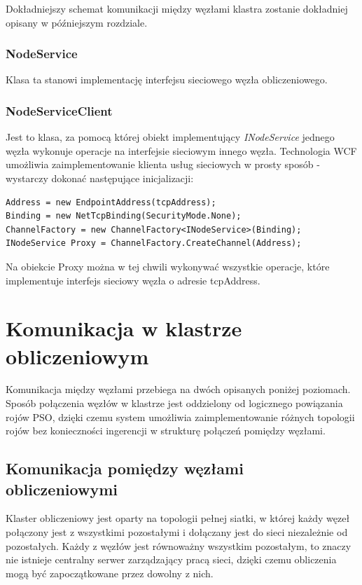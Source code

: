 \documentclass[12pt, twoside, openany, abstract=on]{report}
\theoremstyle{definition}
\begin{document}
Dokładniejszy schemat komunikacji między węzłami klastra zostanie dokładniej opisany w późniejszym rozdziale.

\subsubsection{NodeService}
Klasa ta stanowi implementację interfejsu sieciowego węzła obliczeniowego.

\subsubsection{NodeServiceClient}
Jest to klasa, za pomocą której obiekt implementujący \textit{INodeService} jednego węzła wykonuje operacje na interfejsie sieciowym innego węzła. Technologia WCF umożliwia zaimplementowanie klienta usług sieciowych w prosty sposób - wystarczy dokonać następujące inicjalizacji:


\lstset{style=sharpc}
\begin{lstlisting}[frame=single]
Address = new EndpointAddress(tcpAddress);
Binding = new NetTcpBinding(SecurityMode.None);
ChannelFactory = new ChannelFactory<INodeService>(Binding);
INodeService Proxy = ChannelFactory.CreateChannel(Address);
\end{lstlisting}             

Na obiekcie Proxy można w tej chwili wykonywać wszystkie operacje, które implementuje interfejs sieciowy węzła o adresie tcpAddress.

\section{Komunikacja w klastrze obliczeniowym}
Komunikacja między węzłami przebiega na dwóch opisanych poniżej poziomach. Sposób połączenia węzłów w klastrze jest oddzielony od logicznego powiązania rojów PSO, dzięki czemu system umożliwia zaimplementowanie różnych topologii rojów bez konieczności ingerencji w strukturę połączeń pomiędzy węzłami.

\subsection{Komunikacja pomiędzy węzłami obliczeniowymi}
Klaster obliczeniowy jest oparty na topologii pełnej siatki, w której każdy węzeł połączony jest z wszystkimi pozostałymi i dołączany jest do sieci niezależnie od pozostałych. Każdy z węzłów jest równoważny wszystkim pozostałym, to znaczy nie istnieje centralny serwer zarządzający pracą sieci, dzięki czemu obliczenia mogą być zapoczątkowane przez dowolny z nich.
\end{document}
